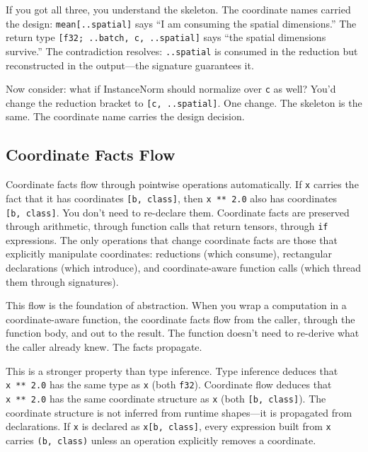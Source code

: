 \documentclass[11pt,titlepage]{article}
\begin{document}
If you got all three, you understand the skeleton. The coordinate names
carried the design: \texttt{mean{[}..spatial{]}} says ``I am consuming
the spatial dimensions.'' The return type
\texttt{{[}f32;\ ..batch,\ c,\ ..spatial{]}} says ``the spatial
dimensions survive.'' The contradiction resolves: \texttt{..spatial} is
consumed in the reduction but reconstructed in the output---the
signature guarantees it.

Now consider: what if InstanceNorm should normalize over \texttt{c} as
well? You'd change the reduction bracket to
\texttt{{[}c,\ ..spatial{]}}. One change. The skeleton is the same. The
coordinate name carries the design decision.

\vspace{2em}

\hypertarget{coordinate-facts-flow}{%
\subsection{Coordinate Facts Flow}\label{coordinate-facts-flow}}

Coordinate facts flow through pointwise operations automatically. If
\texttt{x} carries the fact that it has coordinates
\texttt{{[}b,\ class{]}}, then \texttt{x\ **\ 2.0} also has coordinates
\texttt{{[}b,\ class{]}}. You don't need to re-declare them. Coordinate
facts are preserved through arithmetic, through function calls that
return tensors, through \texttt{if} expressions. The only operations
that change coordinate facts are those that explicitly manipulate
coordinates: reductions (which consume), rectangular declarations (which
introduce), and coordinate-aware function calls (which thread them
through signatures).

This flow is the foundation of abstraction. When you wrap a computation
in a coordinate-aware function, the coordinate facts flow from the
caller, through the function body, and out to the result. The function
doesn't need to re-derive what the caller already knew. The facts
propagate.

This is a stronger property than type inference. Type inference deduces
that \texttt{x\ **\ 2.0} has the same type as \texttt{x} (both
\texttt{f32}). Coordinate flow deduces that \texttt{x\ **\ 2.0} has the
same coordinate structure as \texttt{x} (both \texttt{{[}b,\ class{]}}).
The coordinate structure is not inferred from runtime shapes---it is
propagated from declarations. If \texttt{x} is declared as
\texttt{x{[}b,\ class{]}}, every expression built from \texttt{x}
carries \texttt{(b,\ class)} unless an operation explicitly removes a
coordinate.
\end{document}
